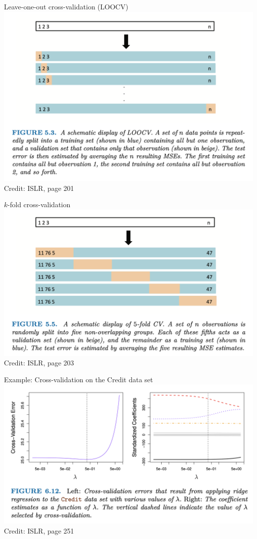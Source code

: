\documentclass{beamer}
\begin{document}
  \begin{frame}{Leave-one-out cross-validation (LOOCV)}
    \includegraphics[width = \textwidth]{images/leave_one_out.png}\\
    \hfill \footnotesize Credit: ISLR, page 201
  \end{frame}

  \begin{frame}{$k$-fold cross-validation}
    \includegraphics[width = \textwidth]{images/cross_validation.png}\\
    \hfill \footnotesize Credit: ISLR, page 203
  \end{frame}

  \begin{frame}{Example: Cross-validation on the Credit data set}
    \includegraphics[width = \textwidth]{images/cross_validation_credit.png}
    \vfill
    \hfill \footnotesize Credit: ISLR, page 251
  \end{frame}
\end{document}
